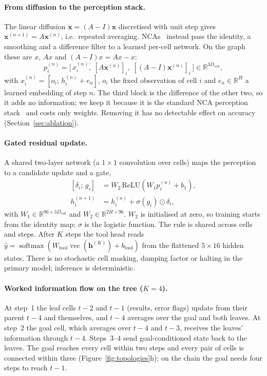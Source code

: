 \documentclass[10pt,twocolumn,letterpaper]{article}
\begin{document}
\paragraph{From diffusion to the perception stack.} The linear diffusion $\dot{\mathbf{x}} = (A-I)\mathbf{x}$ discretised with unit step gives $\mathbf{x}^{(n+1)} = A\mathbf{x}^{(n)}$, i.e.\ repeated averaging. NCAs~\cite{mordvintsev2020growing} instead pass the identity, a smoothing and a difference filter to a learned per-cell network. On the graph these are $x$, $Ax$ and $(A-I)x = Ax - x$:
\begin{equation}\label{eq:perceive}
p_i^{(n)} = \bigl[\,x_i^{(n)},\; [A\mathbf{x}^{(n)}]_i,\; [(A-I)\mathbf{x}^{(n)}]_i\,\bigr] \in \mathbb{R}^{3D_{\text{cell}}},
\end{equation}
with $x_i^{(n)} = [o_i;\, h_i^{(n)} + e_n]$, $o_i$ the fixed observation of cell $i$ and $e_n\in\mathbb{R}^H$ a learned embedding of step $n$. The third block is the difference of the other two, so it adds no information; we keep it because it is the standard NCA perception stack~\cite{mordvintsev2020growing} and costs only weights. Removing it has no detectable effect on accuracy (Section~\ref{sec:ablation}).
\paragraph{Gated residual update.} A shared two-layer network (a $1\times1$ convolution over cells) maps the perception to a candidate update and a gate,
\begin{equation}\label{eq:update}
\begin{aligned}
[\delta_i;\, g_i] &= W_2\,\mathrm{ReLU}(W_1 p_i^{(n)} + b_1),\\
h_i^{(n+1)} &= h_i^{(n)} + \sigma(g_i) \odot \delta_i ,
\end{aligned}
\end{equation}
with $W_1\in\mathbb{R}^{96\times 3D_{\text{cell}}}$ and $W_2\in\mathbb{R}^{2H\times 96}$. $W_2$ is initialised at zero, so training starts from the identity map; $\sigma$ is the logistic function. The rule is shared across cells and steps. After $K$ steps the tool head reads $\hat y = \operatorname{softmax}(W_{\text{tool}}\operatorname{vec}(\mathbf{h}^{(K)}) + b_{\text{tool}})$ from the flattened $5\times16$ hidden states. There is no stochastic cell masking, damping factor or halting in the primary model; inference is deterministic.
\paragraph{Worked information flow on the tree ($K{=}4$).} At step~1 the leaf cells $t{-}2$ and $t{-}1$ (results, error flags) update from their parent $t{-}4$ and themselves, and $t{-}4$ averages over the goal and both leaves. At step~2 the goal cell, which averages over $t{-}4$ and $t{-}3$, receives the leaves' information through $t{-}4$. Steps~3--4 send goal-conditioned state back to the leaves. The goal reaches every cell within two steps and every pair of cells is connected within three (Figure~\ref{fig:topologies}h); on the chain the goal needs four steps to reach $t{-}1$.
\end{document}
